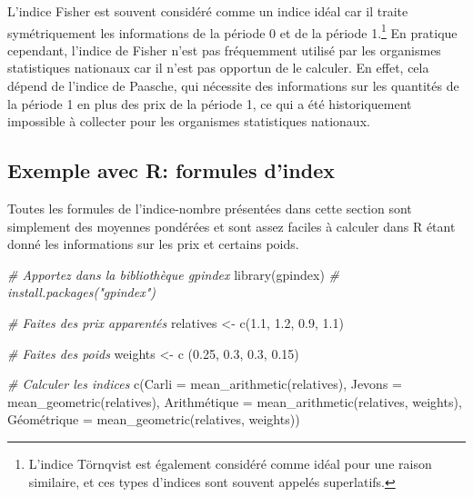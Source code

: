 \documentclass[
]{article}
\newenvironment{Shaded}{\begin{snugshade}}{\end{snugshade}}
\newcommand{\AttributeTok}[1]{\textcolor[rgb]{0.77,0.63,0.00}{#1}}
\newcommand{\CommentTok}[1]{\textcolor[rgb]{0.56,0.35,0.01}{\textit{#1}}}
\newcommand{\FloatTok}[1]{\textcolor[rgb]{0.00,0.00,0.81}{#1}}
\newcommand{\FunctionTok}[1]{\textcolor[rgb]{0.00,0.00,0.00}{#1}}
\newcommand{\NormalTok}[1]{#1}
\newcommand{\OtherTok}[1]{\textcolor[rgb]{0.56,0.35,0.01}{#1}}
\begin{document}
L'indice Fisher est souvent considéré comme un indice idéal car il traite symétriquement les informations de la période 0 et de la période 1.\footnote{L'indice Törnqvist est également considéré comme idéal pour une raison similaire, et ces types d'indices sont souvent appelés superlatifs.} En pratique cependant, l'indice de Fisher n'est pas fréquemment utilisé par les organismes statistiques nationaux car il n'est pas opportun de le calculer. En effet, cela dépend de l'indice de Paasche, qui nécessite des informations sur les quantités de la période 1 en plus des prix de la période 1, ce qui a été historiquement impossible à collecter pour les organismes statistiques nationaux.

\hypertarget{exemple-avec-r-formules-dindex}{%
\subsection{Exemple avec R: formules d'index}\label{exemple-avec-r-formules-dindex}}

Toutes les formules de l'indice-nombre présentées dans cette section sont simplement des moyennes pondérées et sont assez faciles à calculer dans R étant donné les informations sur les prix et certains poids.

\begin{Shaded}
\begin{Highlighting}[]
\CommentTok{\# Apportez dans la bibliothèque gpindex}
\FunctionTok{library}\NormalTok{(gpindex) }\CommentTok{\# install.packages("gpindex")}

\CommentTok{\# Faites des prix apparentés}
\NormalTok{relatives }\OtherTok{\textless{}{-}} \FunctionTok{c}\NormalTok{(}\FloatTok{1.1}\NormalTok{, }\FloatTok{1.2}\NormalTok{, }\FloatTok{0.9}\NormalTok{, }\FloatTok{1.1}\NormalTok{)}

\CommentTok{\# Faites des poids}
\NormalTok{weights }\OtherTok{\textless{}{-}} \FunctionTok{c}\NormalTok{ (}\FloatTok{0.25}\NormalTok{, }\FloatTok{0.3}\NormalTok{, }\FloatTok{0.3}\NormalTok{, }\FloatTok{0.15}\NormalTok{)}

\CommentTok{\# Calculer les indices}
\FunctionTok{c}\NormalTok{(}\AttributeTok{Carli =} \FunctionTok{mean\_arithmetic}\NormalTok{(relatives),}
  \AttributeTok{Jevons =} \FunctionTok{mean\_geometric}\NormalTok{(relatives),}
\NormalTok{  Arithmétique }\OtherTok{=} \FunctionTok{mean\_arithmetic}\NormalTok{(relatives, weights),}
\NormalTok{  Géométrique }\OtherTok{=} \FunctionTok{mean\_geometric}\NormalTok{(relatives, weights))}
\end{Highlighting}
\end{Shaded}
\end{document}
